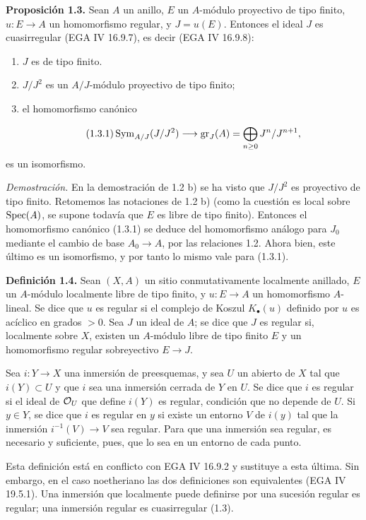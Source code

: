 \textbf{Proposición 1.3.} Sean $A$ un anillo, $E$ un $A$-módulo proyectivo de tipo finito, $u:E\longrightarrow A$ un homomorfismo regular, y $J=u(E)$. Entonces el ideal $J$ es cuasirregular (EGA IV 16.9.7), es decir (EGA IV 16.9.8):
\begin{enumerate}[label=\roman*)]
\item $J$ es de tipo finito.
\item $J/J^2$ es un $A/J$-módulo proyectivo de tipo finito;
\item el homomorfismo canónico
\end{enumerate}
\begin{equation}\tag{1.3.1}
 \operatorname{Sym}_{A/J}(J/J^2)\longrightarrow \operatorname{gr}_J(A)=\bigoplus_{n\geq0}J^n/J^{n+1},
\end{equation}
es un isomorfismo.

\emph{Demostración.} En la demostración de 1.2 b) se ha visto que $J/J^2$ es proyectivo de tipo finito. Retomemos las notaciones de 1.2 b) (como la cuestión es local sobre $\operatorname{Spec}(A)$, se supone todavía que $E$ es libre de tipo finito). Entonces el homomorfismo canónico (1.3.1) se deduce del homomorfismo análogo para $J_0$ mediante el cambio de base $A_0\longrightarrow A$, por las relaciones 1.2. Ahora bien, este último es un isomorfismo, y por tanto lo mismo vale para (1.3.1).

\textbf{Definición 1.4.} Sean $(X,A)$ un sitio conmutativamente localmente anillado, $E$ un $A$-módulo localmente libre de tipo finito, y $u:E\longrightarrow A$ un homomorfismo $A$-lineal. Se dice que $u$ es regular si el complejo de Koszul $K_\bullet(u)$ definido por $u$ es acíclico en grados $>0$. Sea $J$ un ideal de $A$; se dice que $J$ es regular si, localmente sobre $X$, existen un $A$-módulo libre de tipo finito $E$ y un homomorfismo regular sobreyectivo $E\longrightarrow J$.

Sea $i:Y\longrightarrow X$ una inmersión de preesquemas, y sea $U$ un abierto de $X$ tal que $i(Y)\subset U$ y que $i$ sea una inmersión cerrada de $Y$ en $U$. Se dice que $i$ es regular si el ideal de $\mathcal O_U$ que define $i(Y)$ es regular, condición que no depende de $U$. Si $y\in Y$, se dice que $i$ es regular en $y$ si existe un entorno $V$ de $i(y)$ tal que la inmersión $i^{-1}(V)\longrightarrow V$ sea regular. Para que una inmersión sea regular, es necesario y suficiente, pues, que lo sea en un entorno de cada punto.

Esta definición está en conflicto con EGA IV 16.9.2 y sustituye a esta última. Sin embargo, en el caso noetheriano las dos definiciones son equivalentes (EGA IV 19.5.1). Una inmersión que localmente puede definirse por una sucesión regular es regular; una inmersión regular es cuasirregular (1.3).

